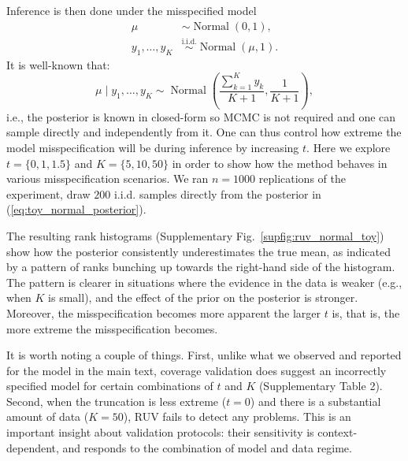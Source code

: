 \documentclass[oneside]{article}
\begin{document}
Inference is then done under the misspecified model
\begin{align*}
 \mu & \sim \operatorname{Normal}\left(0, 1\right),\\
  y_1, \ldots, y_K & \overset{\text{i.i.d.}}{\sim} \operatorname{Normal}\left(\mu, 1\right).
\end{align*}
It is well-known that:
\begin{equation}
\label{eq:toy_normal_posterior}
    \mu \mid y_1, \ldots, y_K \sim \operatorname{Normal}\left( \frac{\sum_{k = 1}^K y_k}{K + 1},  \frac{1}{K + 1} \right),
\end{equation}
i.e., the posterior is known in closed-form so MCMC is not required and one can sample directly and independently from it.
One can thus control how extreme the model misspecification will be during inference by increasing $t$.
Here we explore $t =  \{0, 1, 1.5\}$ and $K = \{5, 10 , 50\}$ in order to show how the method behaves in various misspecification scenarios.
We ran $n=1000$ replications of the experiment, draw $200$ i.i.d. samples directly from the posterior in (\ref{eq:toy_normal_posterior}).

The resulting rank histograms (Supplementary Fig.~\ref{supfig:ruv_normal_toy}) show how the posterior consistently underestimates the true mean, as indicated by a pattern of ranks bunching up towards the right-hand side of the histogram.
The pattern is clearer in situations where the evidence in the data is weaker (e.g., when $K$ is small), and the effect of the prior on the posterior is stronger.
Moreover, the misspecification becomes more apparent the larger $t$ is, that is, the more extreme the misspecification becomes.

It is worth noting a couple of things.
First, unlike what we observed and reported for the model in the main text, coverage validation does suggest an incorrectly specified model for certain combinations of $t$ and $K$ (Supplementary Table 2).
Second, when the truncation is less extreme ($t = 0$) and there is a substantial amount of data ($K = 50$), RUV fails to detect any problems.
This is an important insight about validation protocols: their sensitivity is context-dependent, and responds to the combination of model and data regime.
\end{document}
